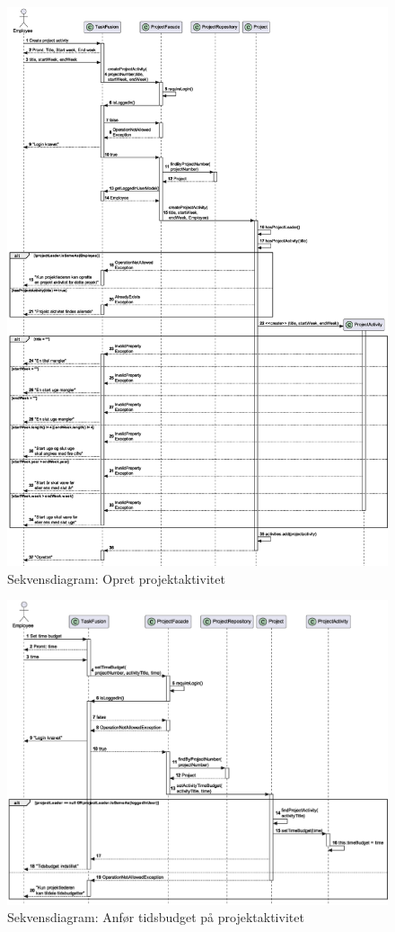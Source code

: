 \begin{figure}[H]
    \centering
    \caption{Sekvensdiagram: Opret projektaktivitet}\label{fig:sequenceCreateProjectActivity}
    \includegraphics[width=\textwidth]{RequirementsAndDesign/SequenceDiagrams/seqCreateProjectActivity.eps}
\end{figure}
\begin{figure}[H]
    \centering
    \caption{Sekvensdiagram: Anfør tidsbudget på projektaktivitet}\label{fig:sequenceSetTimeBudget}
    \includegraphics[width=\textwidth]{RequirementsAndDesign/SequenceDiagrams/seqSetTimeBudget.eps}
\end{figure}
